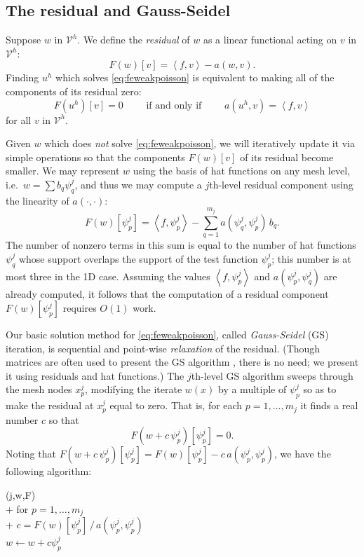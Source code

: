 \documentclass[letterpaper,final,12pt,reqno]{amsart}
\theoremstyle{claim}
\newcommand{\ip}[2]{\left<#1,#2\right>}
\numberwithin{equation}{section}
\numberwithin{figure}{section}
\numberwithin{table}{section}
\begin{document}
\subsection*{The residual and Gauss-Seidel}  Suppose $w$ in $\mathcal{V}^h$.  We define the \emph{residual} of $w$ as a linear functional acting on $v$ in $\mathcal{V}^h$:
\begin{equation}
  F(w)[v] = \ip{f}{v} - a(w,v).  \label{eq:residual}
\end{equation}
Finding $u^h$ which solves \eqref{eq:feweakpoisson} is equivalent to making all of the components of its residual zero:
\begin{equation}
  F(u^h)[v]=0 \qquad \text{ if and only if } \qquad a(u^h,v)=\ip{f}{v} \label{eq:residualweakequivalence}
\end{equation}
for all $v$ in $\mathcal{V}^h$.

Given $w$ which does \emph{not} solve \eqref{eq:feweakpoisson}, we will iteratively update it via simple operations so that the components $F(w)[v]$ of its residual become smaller.  We may represent $w$ using the basis of hat functions on any mesh level, i.e.~$w = \sum b_q \psi_q^j$, and thus we may compute a $j$th-level residual component using the linearity of $a(\cdot,\cdot)$:
\begin{equation}
  F(w)[\psi_p^j] = \ip{f}{\psi_p^j} - \sum_{q=1}^{m_j} a(\psi_q^j,\psi_p^j) \,b_q.  \label{eq:residualpoisson}
\end{equation}
The number of nonzero terms in this sum is equal to the number of hat functions $\psi_q^j$ whose support overlaps the support of the test function $\psi_p^j$; this number is at most three in the 1D case.  Assuming the values $\ip{f}{\psi_p^j}$ and $a(\psi_p^j,\psi_q^j)$ are already computed, it follows that the computation of a residual component $F(w)[\psi_p^j]$ requires $O(1)$ work.

Our basic solution method for \eqref{eq:feweakpoisson}, called \emph{Gauss-Seidel} (GS) iteration, is sequential and point-wise \emph{relaxation} of the residual.  (Though matrices are often used to present the GS algorithm \cite[for example]{Bueler2021,Greenbaum1997}, there is no need; we present it using residuals and hat functions.)  The $j$th-level GS algorithm sweeps through the mesh nodes $x_p^j$, modifying the iterate $w(x)$ by a multiple of $\psi_p^j$ so as to make the residual at $x_p^j$ equal to zero.  That is, for each $p=1,\dots,m_j$ it finds a real number $c$ so that
\begin{equation}
  F(w+c\,\psi_p^j)[\psi_p^j] = 0.  \label{eq:gaussseidelpoint}
\end{equation}
Noting that $F(w+c\,\psi_p^j)[\psi_p^j] = F(w)[\psi_p^j] - c\, a(\psi_p^j,\psi_p^j)$, we have the following algorithm:
\begin{pseudo*}
(j,w,F)\text{:} \\+
    for $p=1,\dots,m_j$ \\+
        $\displaystyle c = F(w)[\psi_p^j]\, \big/ \,a(\psi_p^j,\psi_p^j)$  \\
        $w \gets w + c \psi_p^j$
\end{pseudo*}
\end{document}
